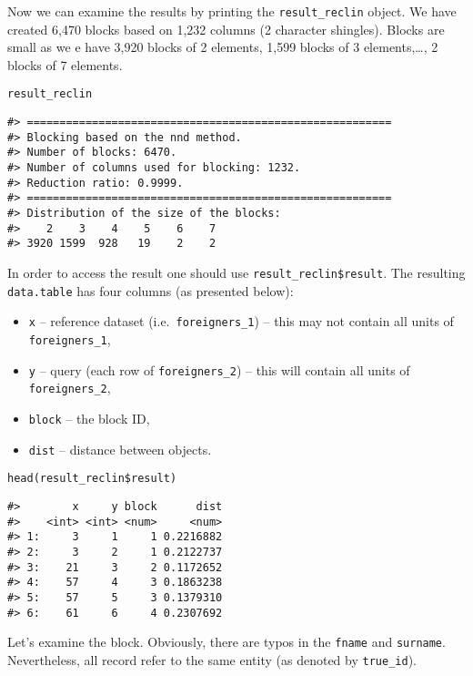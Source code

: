 Now we can examine the results by printing the
\texttt{result\_reclin} object. We have created
6,470
blocks based on 1,232
columns (2 character shingles). Blocks are small as we e have
3,920 blocks of 2
elements, 1,599 blocks of
3 elements,\ldots,
2 blocks of
7 elements.

\begin{verbatim}
result_reclin
\end{verbatim}

\begin{verbatim}
#> ========================================================
#> Blocking based on the nnd method.
#> Number of blocks: 6470.
#> Number of columns used for blocking: 1232.
#> Reduction ratio: 0.9999.
#> ========================================================
#> Distribution of the size of the blocks:
#>    2    3    4    5    6    7 
#> 3920 1599  928   19    2    2
\end{verbatim}

In order to access the result one should use \texttt{result\_reclin\$result}. The
resulting \texttt{data.table} has four columns (as presented below):

\begin{itemize}
\tightlist
\item
  \texttt{x} -- reference dataset (i.e.~\texttt{foreigners\_1}) -- this may not
  contain all units of \texttt{foreigners\_1},
\item
  \texttt{y} -- query (each row of \texttt{foreigners\_2}) -- this will contain all
  units of \texttt{foreigners\_2},
\item
  \texttt{block} -- the block ID,
\item
  \texttt{dist} -- distance between objects.
\end{itemize}

\begin{verbatim}
head(result_reclin$result)
\end{verbatim}

\begin{verbatim}
#>        x     y block      dist
#>    <int> <int> <num>     <num>
#> 1:     3     1     1 0.2216882
#> 2:     3     2     1 0.2122737
#> 3:    21     3     2 0.1172652
#> 4:    57     4     3 0.1863238
#> 5:    57     5     3 0.1379310
#> 6:    61     6     4 0.2307692
\end{verbatim}

Let's examine the block. Obviously, there are typos in the \texttt{fname}
and \texttt{surname}. Nevertheless, all record refer to the same entity (as denoted by \texttt{true\_id}).

